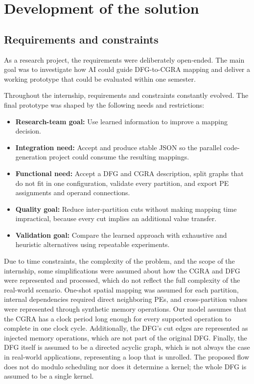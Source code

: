 \graphicspath{{./figures/}}
\section{Development of the solution}

\subsection{Requirements and constraints}
As a research project, the requirements were deliberately open-ended. The main goal was to investigate how AI could guide DFG-to-CGRA mapping and deliver a working prototype that could be evaluated within one semester.

Throughout the internship, requirements and constraints constantly evolved. The final prototype was shaped by the following needs and restrictions:
\begin{itemize}
    \item \textbf{Research-team goal:} Use learned information to improve a mapping decision.
    \item \textbf{Integration need:} Accept and produce stable JSON so the parallel code-generation project could consume the resulting mappings.
    \item \textbf{Functional need:} Accept a DFG and CGRA description, split graphs that do not fit in one configuration, validate every partition, and export PE assignments and operand connections.
    \item \textbf{Quality goal:} Reduce inter-partition cuts without making mapping time impractical, because every cut implies an additional value transfer.
    \item \textbf{Validation goal:} Compare the learned approach with exhaustive and heuristic alternatives using repeatable experiments.
\end{itemize}

Due to time constraints, the complexity of the problem, and the scope of the internship, some simplifications were assumed about how the CGRA and DFG were represented and processed, which do not reflect the full complexity of the real-world scenario. One-shot spatial mapping was assumed for each partition, internal dependencies required direct neighboring PEs, and cross-partition values were represented through synthetic memory operations. Our model assumes that the CGRA has a clock period long enough for every supported operation to complete in one clock cycle. Additionally, the DFG's cut edges are represented as injected memory operations, which are not part of the original DFG\@. Finally, the DFG itself is assumed to be a directed acyclic graph, which is not always the case in real-world applications, representing a loop that is unrolled. The proposed flow does not do modulo scheduling nor does it determine a kernel; the whole DFG is assumed to be a single kernel.

